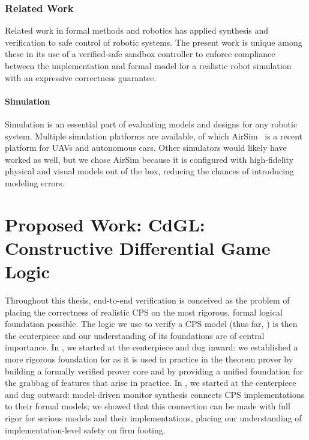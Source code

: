 \documentclass[12pt]{cmuthesis}
\theoremstyle{definition}
\theoremstyle{remark}
\newcommand{\rref}[2][]{\prettyref{#2}}
\newcommand{\CdGL}{\textsf{CdGL}\xspace}
\begin{document}
\subsection{Related Work}
Related work in formal methods and robotics has applied synthesis and verification to safe control of robotic systems.
The present work is unique among these in its use of a verified-safe sandbox controller to enforce compliance between the implementation and formal model for a realistic robot simulation with an expressive correctness guarantee.

\subsubsection{Simulation}
Simulation is an essential part of evaluating models and designs for any robotic system.
Multiple simulation platforms are available, of which AirSim~\cite{shah2018airsim} is a recent platform for UAVs and autonomous cars.
Other simulators would likely have worked as well, but we chose AirSim because it is configured with high-fidelity physical and visual models out of the box, reducing the chances of introducing modeling errors.

\chapter{Proposed Work: \CdGL: Constructive Differential Game Logic}
\label{ch:cdgl}
Throughout this thesis, end-to-end verification is conceived as the problem of placing the correctness of realistic CPS on the most rigorous, formal logical foundation possible.
The logic we use to verify a CPS model (thus far, \dL) is then the centerpiece and our understanding of its foundations are of central importance.
In \rref{ch:logical-foundations}, we started at the centerpiece and dug inward: we established a more rigorous foundation for \dL as it is used in practice in the theorem prover by building a formally verified prover core and by providing a unified foundation for the grabbag of features that arise in practice.
In \rref{ch:end-to-end-v}, we started at the centerpiece and dug outward: model-driven monitor synthesis connects CPS implementations to their formal models;
we showed that this connection can be made with full rigor for serious models and their implementations, placing our understanding of implementation-level safety on firm footing.
\end{document}

